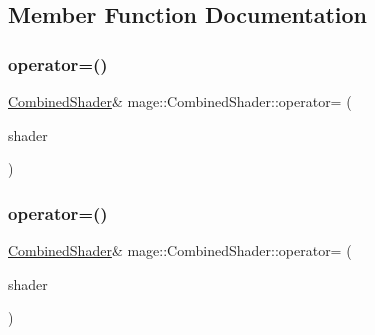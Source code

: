 \subsection{Member Function Documentation}
\hypertarget{structmage_1_1_combined_shader_a14859fb597c07309fd269b56af373c02}{}\label{structmage_1_1_combined_shader_a14859fb597c07309fd269b56af373c02} 
\subsubsection{\texorpdfstring{operator=()}{operator=()}\hspace{0.1cm}{\footnotesize\ttfamily [1/2]}}
{\footnotesize\ttfamily \hyperlink{structmage_1_1_combined_shader}{Combined\+Shader}\& mage\+::\+Combined\+Shader\+::operator= (\begin{DoxyParamCaption}\item[{const \hyperlink{structmage_1_1_combined_shader}{Combined\+Shader} \&}]{shader }\end{DoxyParamCaption})\hspace{0.3cm}{\ttfamily [default]}}

\hypertarget{structmage_1_1_combined_shader_ad05cf0e2c4f0cd7d37ad5be971aefd1b}{}\label{structmage_1_1_combined_shader_ad05cf0e2c4f0cd7d37ad5be971aefd1b} 
\subsubsection{\texorpdfstring{operator=()}{operator=()}\hspace{0.1cm}{\footnotesize\ttfamily [2/2]}}
{\footnotesize\ttfamily \hyperlink{structmage_1_1_combined_shader}{Combined\+Shader}\& mage\+::\+Combined\+Shader\+::operator= (\begin{DoxyParamCaption}\item[{\hyperlink{structmage_1_1_combined_shader}{Combined\+Shader} \&\&}]{shader }\end{DoxyParamCaption})\hspace{0.3cm}{\ttfamily [default]}}

\hypertarget{structmage_1_1_combined_shader_a4bdcd586139988dee2891df899de5ff2}{}\label{structmage_1_1_combined_shader_a4bdcd586139988dee2891df899de5ff2} 

